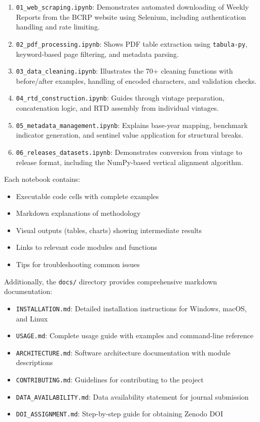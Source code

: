 \documentclass[a4paper, fleqn, 11pt]{article}
\newcommand{\filepath}[1]{\texttt{#1}}
\begin{document}
\begin{enumerate}
    \item \filepath{01\_web\_scraping.ipynb}: Demonstrates automated downloading of Weekly Reports from the BCRP website using Selenium, including authentication handling and rate limiting.

    \item \filepath{02\_pdf\_processing.ipynb}: Shows PDF table extraction using \texttt{tabula-py}, keyword-based page filtering, and metadata parsing.

    \item \filepath{03\_data\_cleaning.ipynb}: Illustrates the 70+ cleaning functions with before/after examples, handling of encoded characters, and validation checks.

    \item \filepath{04\_rtd\_construction.ipynb}: Guides through vintage preparation, concatenation logic, and RTD assembly from individual vintages.

    \item \filepath{05\_metadata\_management.ipynb}: Explains base-year mapping, benchmark indicator generation, and sentinel value application for structural breaks.

    \item \filepath{06\_releases\_datasets.ipynb}: Demonstrates conversion from vintage to release format, including the NumPy-based vertical alignment algorithm.
\end{enumerate}

Each notebook contains:
\begin{itemize}
    \item Executable code cells with complete examples
    \item Markdown explanations of methodology
    \item Visual outputs (tables, charts) showing intermediate results
    \item Links to relevant code modules and functions
    \item Tips for troubleshooting common issues
\end{itemize}

Additionally, the \filepath{docs/} directory provides comprehensive markdown documentation:
\begin{itemize}
    \item \filepath{INSTALLATION.md}: Detailed installation instructions for Windows, macOS, and Linux
    \item \filepath{USAGE.md}: Complete usage guide with examples and command-line reference
    \item \filepath{ARCHITECTURE.md}: Software architecture documentation with module descriptions
    \item \filepath{CONTRIBUTING.md}: Guidelines for contributing to the project
    \item \filepath{DATA\_AVAILABILITY.md}: Data availability statement for journal submission
    \item \filepath{DOI\_ASSIGNMENT.md}: Step-by-step guide for obtaining Zenodo DOI
\end{itemize}
\end{document}
